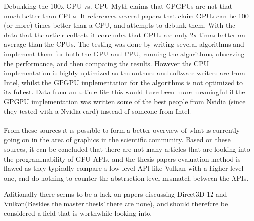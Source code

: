 Debunking the 100x \gls{GPU} vs. CPU Myth \cite{lee_2010_debunking} claims that GP\glspl{GPU} are not that much better than \glspl{CPU}. 
It references several papers that claim \glspl{GPU} can be 100 (or more) times better than a \gls{CPU}, and attempts to debunk them. 
With the data that the article collects it concludes that \glspl{GPU} are only 2x times better on average than the \glspl{CPU}. 
The testing was done by writing several algorithms and implement them for both the \gls{GPU} and \gls{CPU}, running the algorithms, observing the performance, and then comparing the results. 
However the \gls{CPU} implementation is highly optimized as the authors and software writers are from Intel, whilst the GP\gls{GPU} implementation for the algorithms is not optimized to its fullest. 
Data from an article like this would have been more meaningful if the GP\gls{GPU} implementation was written some of the best people from Nvidia (since they tested with a Nvidia card) instead of someone from Intel.

\paragraph{}
From these sources it is possible to form a better overview of what is currently going on in the area of graphics in the scientific community. Based on these sources, it can be concluded that there are not many articles that are looking into the programmability of \gls{GPU} \glspl{API}, and the thesis papers evaluation method is flawed as they typically compare a low-level \gls{API} like Vulkan with a higher level one, and do nothing to counter the abstraction level mismatch between the \glspl{API}.

Aditionally there seems to be a lack on papers discussing Direct3D 12 and Vulkan(Besides the master thesis' there are none), and should therefore be considered a field that is worthwhile looking into.
